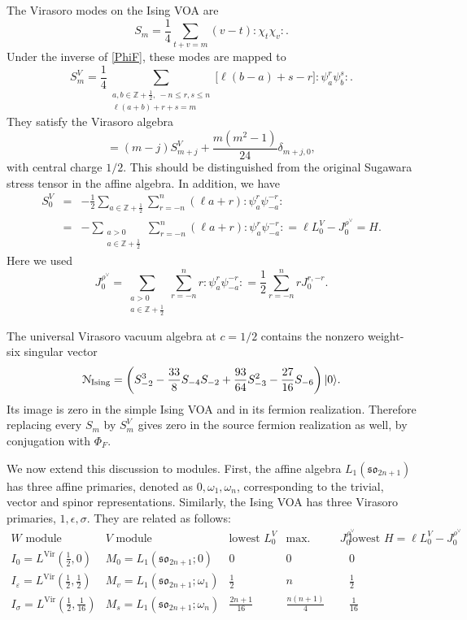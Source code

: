 \documentclass[a4paper,11pt]{article}
\theoremstyle{definition}
\theoremstyle{definition}
\theoremstyle{remark}
\newcommand{\be}{\begin{equation}}
\newcommand{\ee}{\end{equation}}
\newcommand{\beqn}{\begin{eqnarray}}
\newcommand{\eeqn}{\end{eqnarray}}
\begin{document}
The   Virasoro modes on the  Ising VOA are
\be
S_m=\frac14\sum_{t+v=m}(v-t):\chi_t\chi_v:.
\ee
Under the inverse  of   \eqref{PhiF}, these modes are  mapped to
  \be 
S^V_m=
\frac14
\sum_{\substack{
a,b\in\mathbb Z+\frac12,\ -n\le r,s\le n\\
\ell(a+b)+r+s=m}}
\bigl[\ell(b-a)+s-r\bigr]:\psi^r_a\psi^s_b:.
\ee 
They satisfy the Virasoro algebra  
\be
[S^V_m,S^V_j]
=(m-j)  S^V_{m+j}
+\frac{m(m^2-1)}{24}\delta_{m+j,0},
\ee  
with central charge $1/2$. This should be distinguished from the original Sugawara stress tensor in the affine algebra. 
In addition, we have
%
 \beqn
 S^V_0 &=& -\frac12
 \sum_{a\in\mathbb Z+\frac12}\sum_{r=-n}^n
 (\ell a+r):\psi^r_a\psi^{-r}_{-a}:
 \label{eq:fermion-S0-full}\\
 &=&-\sum_{\substack{a>0\\a\in\mathbb Z+\frac12}}\sum_{r=-n}^n
 (\ell a+r):\psi^r_a\psi^{-r}_{-a}:
 =\ell L_0^V-J_0^{\rho^\vee}=H.
 \label{eq:fermion-S0-half}
\eeqn 
%
Here we used
%
\be\label{J0rho}
J_0^{\rho^\vee}
=\sum_{\substack{a>0\\a\in\mathbb Z+\frac12}}\sum_{r=-n}^n
r:\psi^r_a\psi^{-r}_{-a}:
=\frac12\sum_{r=-n}^n rJ^{r,-r}_0.
\ee
 


  
  
 The universal Virasoro vacuum algebra at $c=1/2$ contains the nonzero weight-six singular vector
\be\label{eq:ising-weight-six-singular}
\mathcal N_{\rm Ising}=
\left(
S_{-2}^3
-\frac{33}{8}S_{-4}S_{-2}
+\frac{93}{64}S_{-3}^2
-\frac{27}{16}S_{-6}
\right)|0\rangle.
\ee
Its image is zero in the simple Ising VOA and in its fermion realization. Therefore replacing every $S_m$ by $S_m^V$ gives zero in the source fermion realization as well, by conjugation with $\Phi_F$. 
 
We now extend this discussion to modules. First, the affine algebra $L_1(\mathfrak{so}_{2n+1})$ has three affine primaries,   denoted as $0, \omega_1, \omega_n$, corresponding to the trivial, vector and spinor representations.  Similarly, the Ising VOA has three  Virasoro primaries, $1, \epsilon, \sigma$. They are related as follows:  
  \be
\begin{array}{c|c|c|c|c}
W\text{ module}&V\text{ module}&\text{lowest }L_0^V
&\text{max. ground }J_0^{\rho^\vee}&\text{lowest }H=\ell L_0^V-J_0^{\rho^\vee}\\\hline
I_0=L^{\mathrm{Vir}}(\frac12,0)&M_0=L_1(\mathfrak{so}_{2n+1};0)&0&0&0\\
I_\varepsilon=L^{\mathrm{Vir}}(\frac12,\frac12)&M_v=L_1(\mathfrak{so}_{2n+1};\omega_1)&\frac12&n&\frac12\\
I_\sigma=L^{\mathrm{Vir}}(\frac12,\frac1{16})&M_s=L_1(\mathfrak{so}_{2n+1};\omega_n)&\frac{2n+1}{16}&\frac{n(n+1)}4&\frac1{16}
\end{array}
\ee 
\end{document}
